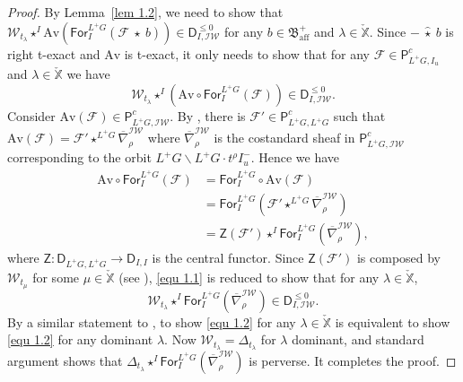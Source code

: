\documentclass[11pt]{amsart}
\numberwithin{equation}{section}
\theoremstyle{plain}
\theoremstyle{definition}
\newcommand{\D}{{\mathsf D}}
\newcommand{\sF}{{\mathcal F}}
\renewcommand{\P}{{\mathsf P}}
\newcommand{\sW}{{\mathcal W}}
\newcommand{\X}{{\mathbb X}}
\newcommand{\Xd}{\check{\X}}
\newcommand{\For}{\mathsf{For}}
\newcommand{\Av}{\mathrm{Av}}
\newcommand{\IW}{\mathcal{IW}}
\newcommand{\af}{\mathrm{aff}}
\begin{document}
\begin{proof}
By Lemma~\ref{lem 1.2}, we need to show that $\sW_{t_\lambda}\star^I \Av( \For^{L^+G}_I(\sF\ \widehat{\star}\ b))\in \D^{\leq 0}_{I,\IW}$ for any $b\in \mathfrak{B}^+_\af$ and $\lambda\in \Xd$. 
Since $-\ \widehat{\star}\ b$ is right t-exact and $\Av$ is t-exact, it only needs to show that for any $\sF\in \P^c_{L^+G,I_u}$ and $\lambda \in \Xd$ we have 
\begin{equation}\label{equ 1.1}
\sW_{t_\lambda}\star^I (\Av \circ\For^{L^+G}_I(\sF))\in \D^{\leq 0}_{I,\IW}. 
\end{equation}
Consider $\Av(\sF)\in \P^c_{L^+G,\IW}$. 
By \cite[Thm 3.9]{BGMRR}, there is $\sF'\in \P^c_{L^+G,L^+G}$ such that $\Av(\sF)=\sF' \star^{L^+G} \overline{\nabla}^{\IW}_{\rho}$ where $\overline{\nabla}^{\IW}_{\rho}$ is the costandard sheaf in $\P^c_{L^+G,\IW}$ corresponding to the orbit $L^+G\backslash L^+G \cdot t^\rho I^-_u$. 
Hence we have 
\begin{align*}
\Av \circ\For^{L^+G}_I(\sF) &= \For^{L^+G}_I \circ \Av(\sF)\\
&= \For^{L^+G}_I( \sF' \star^{L^+G} \overline{\nabla}^{\IW}_{\rho}) \\
&= \mathsf{Z}(\sF') \star^{I} \For^{L^+G}_I(\overline{\nabla}^{\IW}_{\rho}), 
\end{align*}
where $\mathsf{Z}:\D_{L^+G,L^+G}\rightarrow \D_{I,I}$ is the central functor. 
Since $\mathsf{Z}(\sF')$ is composed by $\sW_{t_\mu}$ for some $\mu\in \Xd$ (see \cite[Thm 4.4.5]{ARbook}), \eqref{equ 1.1} is reduced to show that for any $\lambda \in \Xd$, 
\begin{equation}\label{equ 1.2}
\sW_{t_\lambda}\star^I \For^{L^+G}_I(\overline{\nabla}^{\IW}_{\rho})\in \D^{\leq 0}_{I,\IW}. 
\end{equation}
By a similar statement to \cite[Lem 4.4]{adr}, to show \eqref{equ 1.2} for any $\lambda\in \Xd$ is equivalent to show  \eqref{equ 1.2} for any dominant $\lambda$. 
Now $\sW_{t_\lambda}=\Delta_{t_\lambda}$ for $\lambda$ dominant, and standard argument shows that $\Delta_{t_\lambda}\star^I \For^{L^+G}_I(\overline{\nabla}^{\IW}_{\rho})$ is perverse. 
It completes the proof. 
\end{proof}
\end{document}
